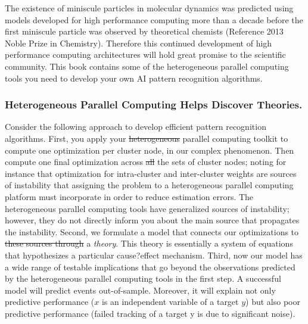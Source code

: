 \documentclass[10pt]{article}[draft]
\begin{document}
The existence of miniscule particles in molecular dynamics was predicted using models developed for high performance computing more than a decade before the first miniscule particle was observed  by theoretical chemists (Reference 2013 Noble Prize in Chemistry). Therefore this continued development of high performance computing architectures will hold great promise to the scientific community. This book contains some of the  heterogeneous parallel computing  tools you need to develop your own AI pattern recognition algorithms.

\vspace{0.25in}

\subsubsection*{Heterogeneous Parallel Computing Helps Discover Theories.}

Consider the following approach to develop efficient pattern recognition algorithms. First, you apply your \st{heterogeneous} parallel computing toolkit to compute one optimization per cluster node, in our complex phenomenon. Then compute one final optimization across \st{all} the sets of cluster nodes; noting for instance that optimization for intra-cluster and inter-cluster weights are sources of instability that assigning the problem to a heterogeneous parallel computing platform  must incorporate in order to reduce estimation errors. The heterogeneous parallel computing tools have generalized  sources of instability; however, they do not directly inform you about the main source that propagates the instability. Second, we formulate a model that connects our optimizations to  \st{these sources through} a \emph{theory}. This theory is essentially a system of equations that hypothesizes a particular cause?effect mechanism. Third, now our model has a wide range of testable implications that go beyond the observations predicted by the heterogeneous parallel computing tools in the first step. A successful model will predict events out-of-sample. Moreover, it will explain not only predictive performance ($x$ is an independent variable of a target $y$) but also poor predictive performance (failed tracking of a target y is due to significant noise). 
	
\end{document}
